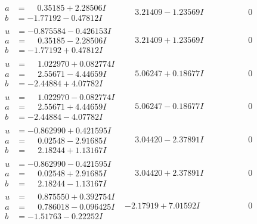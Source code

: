 \documentclass[1p]{elsarticle_modified}
\theoremstyle{definition}
\begin{document}
$$\begin{array}{c|c|c}
\begin{aligned}
a &= \phantom{-}0.35185 + 2.28506 I \\
b &= -1.77192 - 0.47812 I\end{aligned}
 & \phantom{-}3.21409 - 1.23569 I & \phantom{-0.000000 } 0 \\ \hline\begin{aligned}
u &= -0.875584 - 0.426153 I \\
a &= \phantom{-}0.35185 - 2.28506 I \\
b &= -1.77192 + 0.47812 I\end{aligned}
 & \phantom{-}3.21409 + 1.23569 I & \phantom{-0.000000 } 0 \\ \hline\begin{aligned}
u &= \phantom{-}1.022970 + 0.082774 I \\
a &= \phantom{-}2.55671 - 4.44659 I \\
b &= -2.44884 + 4.07782 I\end{aligned}
 & \phantom{-}5.06247 + 0.18677 I & \phantom{-0.000000 } 0 \\ \hline\begin{aligned}
u &= \phantom{-}1.022970 - 0.082774 I \\
a &= \phantom{-}2.55671 + 4.44659 I \\
b &= -2.44884 - 4.07782 I\end{aligned}
 & \phantom{-}5.06247 - 0.18677 I & \phantom{-0.000000 } 0 \\ \hline\begin{aligned}
u &= -0.862990 + 0.421595 I \\
a &= \phantom{-}0.02548 - 2.91685 I \\
b &= \phantom{-}2.18244 + 1.13167 I\end{aligned}
 & \phantom{-}3.04420 - 2.37891 I & \phantom{-0.000000 } 0 \\ \hline\begin{aligned}
u &= -0.862990 - 0.421595 I \\
a &= \phantom{-}0.02548 + 2.91685 I \\
b &= \phantom{-}2.18244 - 1.13167 I\end{aligned}
 & \phantom{-}3.04420 + 2.37891 I & \phantom{-0.000000 } 0 \\ \hline\begin{aligned}
u &= \phantom{-}0.875550 + 0.392754 I \\
a &= \phantom{-}0.786018 - 0.096425 I \\
b &= -1.51763 - 0.22252 I\end{aligned}
 & -2.17919 + 7.01592 I & \phantom{-0.000000 } 0 \\ \hline\begin{aligned}

\end{aligned}
\end{array}$$
\end{document}
